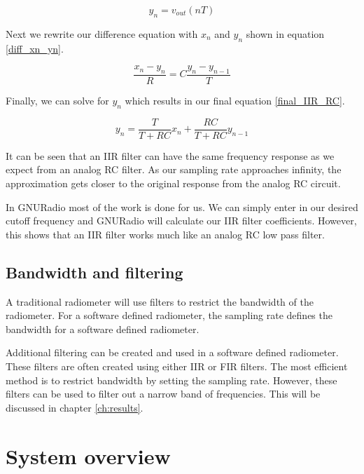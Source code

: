 \begin{equation}\label{output_IIR}
y_n=v_{out}(nT)
\end{equation}

Next we rewrite our difference equation with $x_n$ and $y_n$ shown in equation \ref{diff_xn_yn}.

\begin{equation}\label{diff_xn_yn}
\frac{x_n-y_n}{R}=C\frac{y_n-y_{n-1}}{T}
\end{equation}

Finally, we can solve for $y_n$ which results in our final equation \ref{final_IIR_RC}.

\begin{equation}\label{final_IIR_RC}
y_n=\frac{T}{T+RC}x_n+\frac{RC}{T+RC}y_{n-1}
\end{equation}

It can be seen that an IIR filter can have the same frequency response as we expect from an analog RC filter.  As our sampling rate approaches infinity, the approximation gets closer to the original response from the analog RC circuit.  


In GNURadio most of the work is done for us.  We can simply enter in our desired cutoff frequency and GNURadio will calculate our IIR filter coefficients.  However, this shows that an IIR filter works much like an analog RC low pass filter.

\subsection{Bandwidth and filtering}
A traditional radiometer will use filters to restrict the bandwidth of the radiometer.  For a software defined radiometer, the sampling rate defines the bandwidth for a software defined radiometer.  

Additional filtering can be created and used in a software defined radiometer.  These filters are often created using either IIR or FIR filters.  The most efficient method is to restrict bandwidth by setting the sampling rate.  However, these filters can be used to filter out a narrow band of frequencies.  This will be discussed in chapter \ref{ch:results}.

\section{System overview}

